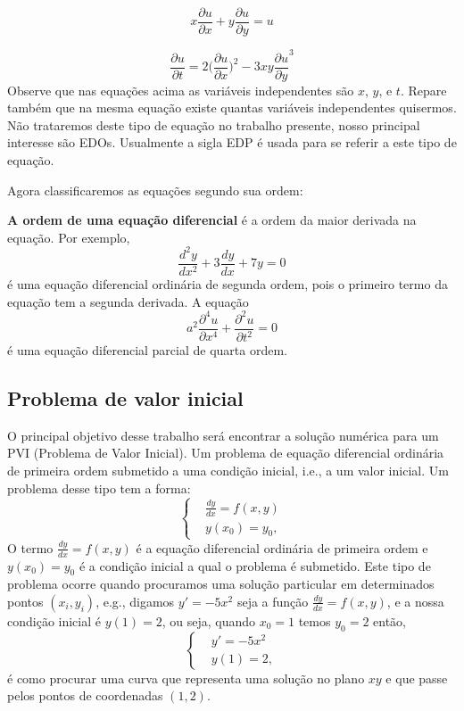 \begin{equation*}
x\frac{\partial u}{\partial x} + y\frac{\partial u}{\partial y} = u
\end{equation*}

\begin{equation*}
\frac{\partial u}{\partial t} = 2\biggl(\frac{\partial u}{\partial x}\biggl)^{2} - 3xy\frac{\partial u}{\partial y}^{3}
\end{equation*}
Observe que nas equações acima as variáveis independentes
são $x$, $y$, e $t$. Repare também que na mesma equação existe quantas variáveis
independentes quisermos. Não trataremos deste tipo de equação no trabalho presente,
nosso principal interesse são EDOs. Usualmente a sigla EDP é usada para se referir a este tipo de equação.

Agora classificaremos as equações segundo sua ordem:

\textbf{A ordem de uma equação diferencial} é a ordem da maior derivada na equação. Por exemplo,
\begin{equation*}
\frac{d^{2}y}{dx^{2}} + 3\frac{dy}{dx} + 7y = 0
\end{equation*}
é uma equação diferencial ordinária de segunda ordem, pois o primeiro termo
da equação tem a segunda derivada. A equação
\begin{equation*}
a^{2}\frac{\partial^{4}u}{\partial x^{4}} + \frac{\partial^2u}{\partial t^{2}} = 0
\end{equation*}
é uma equação diferencial parcial de quarta ordem.

\subsection{Problema de valor inicial}

O principal objetivo desse trabalho será encontrar a solução numérica para um
PVI (Problema de Valor Inicial). Um problema de equação diferencial ordinária de
primeira ordem submetido a uma condição inicial, i.e., a um valor inicial. Um problema desse tipo
tem a forma:
\begin{equation*}
\left\{
\begin{aligned}
 &\frac{dy}{dx} = f(x,y) \\
 &y(x_{0}) = y_{0},
\end{aligned}
\right.
\end{equation*}
O termo $\frac{dy}{dx} = f(x,y)$ é a equação diferencial ordinária de primeira ordem e
$y(x_{0}) = y_{0}$ é a condição inicial a qual o problema é submetido. Este tipo
de problema ocorre quando procuramos uma solução particular em determinados pontos $(x_{i},y_{i})$, e.g., digamos $y' = -5x^{2}$
seja a função $\frac{dy}{dx} = f(x,y)$, e a nossa condição inicial é $y(1) = 2$,
ou seja, quando $x_{0} = 1$ temos $y_{0} = 2$ então,
\begin{equation*}
\left\{
\begin{aligned}
 &y' = -5x^{2} \\
 &y(1) = 2,
\end{aligned}
\right.
\end{equation*}
é como procurar uma curva que representa uma solução no plano $xy$ e que passe
pelos pontos de coordenadas $(1,2)$.

